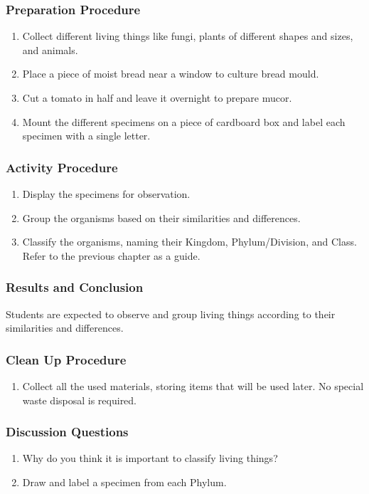\subsubsection*{Preparation Procedure}
\begin{enumerate}
\item{Collect different living things like fungi, plants of different shapes and sizes, and animals.}
\item{ Place a piece of moist bread near a window to culture bread mould.}
\item{ Cut a tomato in half and leave it overnight to prepare mucor.}
\item{Mount the different specimens on a piece of cardboard box and label each specimen with a single letter.}
\end{enumerate}

\subsubsection*{Activity Procedure}
\begin{enumerate}
\item{Display the specimens for observation.}
\item{Group the organisms based on their similarities and differences.}
\item{Classify the organisms, naming their Kingdom, Phylum/Division, and Class. Refer to the previous chapter as a guide.}
\end{enumerate}

\subsubsection*{Results and Conclusion}
Students are expected to observe and group living things according to their similarities and differences.

\subsubsection*{Clean Up Procedure}
\begin{enumerate}
\item{Collect all the used materials, storing items that will be used later. No special waste disposal is required.}
\end{enumerate}

\subsubsection*{Discussion Questions}
\begin{enumerate}
\item{Why do you think it is important to classify living things?}
\item{Draw and label a specimen from each Phylum.}
\end{enumerate}


